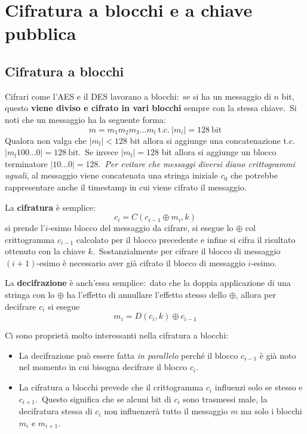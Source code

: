 \chapter{Cifratura a blocchi e a chiave pubblica}

\section{Cifratura a blocchi}

Cifrari come l'AES e il DES lavorano a blocchi:\ se si ha un messaggio di $n$ bit, questo \textbf{viene diviso e cifrato in vari blocchi} sempre con la stessa chiave.\
Si noti che un messaggio ha la seguente forma:\ \[m = m_1 m_2 m_3 \dots m_l\ \mathrm{t.c.}\ |m_i| = 128\ \mathrm{bit}\]
Qualora non valga che $|m_l| < 128$ bit allora si aggiunge una concatenazione t.c.\ $|m_l 100\dots 0| = 128\ \mathrm{bit}$.\
Se invece $|m_l| = 128$ bit allora si aggiunge un blocco terminatore $|10\dots 0| = 128$.\
\textit{Per evitare che messaggi diversi diano crittogrammi uguali}, al messaggio viene concatenata una stringa iniziale $c_0$ che potrebbe rappresentare anche il timestamp in cui viene cifrato il messaggio.\

La \textbf{cifratura} è semplice:\
\[c_i = C(c_{i-1} \oplus m_i, k)\]
si prende l'$i$-esimo blocco del messaggio da cifrare, si esegue lo $\oplus$ col crittogramma $c_{i-1}$ calcolato per il blocco precedente e infine si cifra il risultato ottenuto con la chiave $k$.\
Sostanzialmente per cifrare il blocco di messaggio $(i + 1)$-esimo è necessario aver già cifrato il blocco di messaggio $i$-esimo.\

La \textbf{decifrazione} è anch'essa semplice:\ dato che la doppia applicazione di una stringa con lo $\oplus$ ha l'effetto di annullare l'effetto stesso dello $\oplus$, allora per decifrare $c_i$ si esegue
\[m_i = D(c_i, k) \oplus c_{i-1}\]

\noindent Ci sono proprietà molto interessanti nella cifratura a blocchi:\
\begin{itemize}
    \item La decifrazione può essere fatta \textit{in parallelo} perché il blocco $c_{i-1}$ è già noto nel momento in cui bisogna decifrare il blocco $c_i$.
    \item La cifratura a blocchi prevede che il crittogramma $c_i$ influenzi solo se stesso e $c_{i+1}$.\ Questo significa che se alcuni bit di $c_i$ sono trasmessi male, la decifratura stessa di $c_i$ non influenzerà tutto il messaggio $m$ ma solo i blocchi $m_i$ e $m_{i+1}$.\
\end{itemize}

